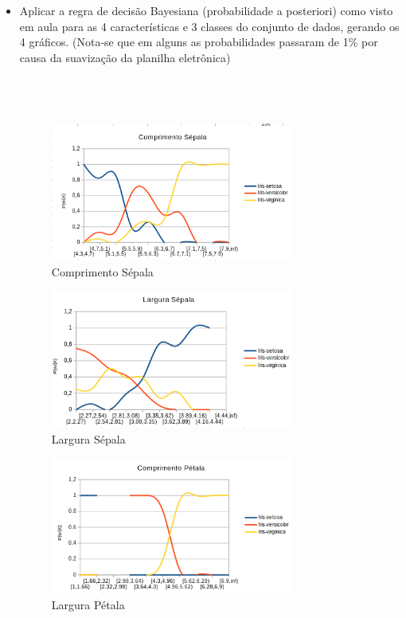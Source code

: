 \documentclass[a4paper, 12pt]{article}
\begin{document}
\begin{enumerate}
\begin{itemize}
  \item Aplicar a regra de decisão Bayesiana (probabilidade a posteriori) como visto em aula para as 4 características e 3 classes do conjunto de dados, gerando os 4 gráficos. (Nota-se que em alguns as probabilidades passaram de 1\% por causa da suavização da planilha eletrônica)\\\\\\\\
    \begin{figure}[h!]
    \centering
    \includegraphics[width=80mm]{img10.png}
    \caption{Comprimento Sépala}
    \end{figure}

    \begin{figure}[h!]
    \centering
    \includegraphics[width=80mm]{img11.png}
    \caption{Largura Sépala}
    \end{figure}

    \begin{figure}[h!]
    \centering
    \includegraphics[width=80mm]{img12.png}
    \caption{Largura Pétala}
    \end{figure}


\end{itemize}
\end{enumerate}
\end{document}
